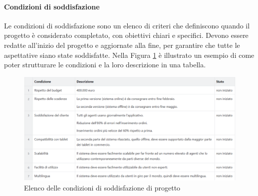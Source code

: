         \paragraph{Condizioni di soddisfazione}
        Le condizioni di soddisfazione sono un elenco di criteri che definiscono quando il progetto è considerato completato,
        con obiettivi chiari e specifici. Devono essere redatte all'inizio del progetto e aggiornate alla fine, per garantire
        che tutte le aspettative siano state soddisfatte. Nella Figura \ref{fig:cond-sodd} è illustrato un esempio di come poter strutturare
        le condizioni e la loro descrizione in una tabella.
        \begin{figure}
            \centering
            \includegraphics[width=\linewidth]{figures/CoS.png}
            \caption{Elenco delle condizioni di soddisfazione di progetto}
            \label{fig:cond-sodd}
        \end{figure}

